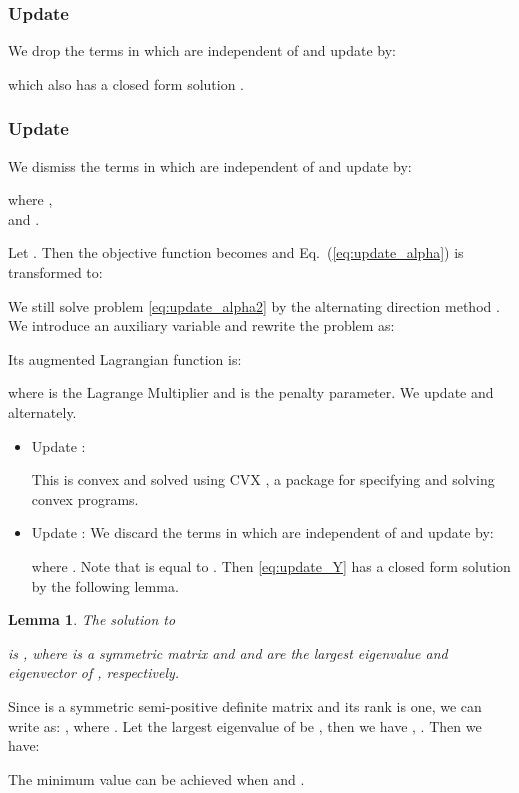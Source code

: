 \documentclass[10pt,twocolumn,letterpaper]{article}
\newtheorem{lemma}[theorem]{Lemma}
\newenvironment{proof}[1][Proof]{\begin{trivlist}
\item[\hskip \labelsep {\bfseries #1}]}{\end{trivlist}}
\begin{document}
\subsubsection{Update }
We drop the terms in  which are independent of
 and update  by:

which also has a closed form solution \cite{liu2013linearized}.


\subsubsection{Update }
We dismiss the terms in  which are independent of
 and update  by:

where  , \\

and .

Let . Then the objective function becomes  and Eq.~(\ref{eq:update_alpha}) is transformed
to:


We still solve problem \eqref{eq:update_alpha2} by the alternating
direction method \cite{liu2013linearized}. We introduce an
auxiliary variable  and rewrite the problem as:

Its augmented Lagrangian function is:

where  is the Lagrange Multiplier and  is the penalty
parameter. We update  and  alternately.

\begin{itemize}
\item {Update : }

This is convex and solved using CVX \cite{c23}, a package for specifying and solving convex programs.

\item{Update : } We discard the terms in 
which are independent of  and update  by:

where . Note that  is equal to . Then
\eqref{eq:update_Y} has a closed form solution by the following
lemma.
\end{itemize}

\begin{lemma}
\label{lemma1} The solution to

is , where  is a symmetric
matrix and  and  are the largest eigenvalue and
eigenvector of , respectively.
\end{lemma}

\begin{proof}
Since  is a symmetric semi-positive definite matrix and its
rank is one, we can write  as: , where
. Let the largest eigenvalue of  be ,
then we have , . Then we
have:

\end{proof}
The minimum value can be achieved when  and
.
\end{document}
